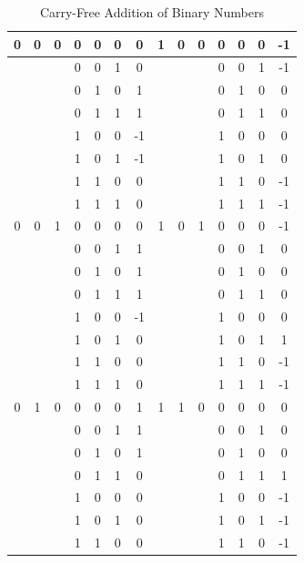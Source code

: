 \documentclass[conference]{IEEEtran}
\begin{document}
\vspace{-.5em}
\begin{table}[h!]
  \centering
  \caption{Carry-Free Addition of Binary Numbers}
  \label{tab:table5}
  \begin{tabular}{|c|c|c|c|c|c||c|||c|c|c|c|c|c||c|}
    \hline
    0 & 0 & 0 & 0 & 0 & 0 & 0  &  1 & 0 & 0 & 0 & 0 & 0 & -1 \\
    \hline
    & & & 0 & 0 & 1 & 0  &  & & & 0 & 0 & 1 & -1 \\
    \hline
    & & & 0 & 1 & 0 & 1  &  & & & 0 & 1 & 0 & 0 \\
    \hline
    & & & 0 & 1 & 1 & 1  &  & & & 0 & 1 & 1 & 0 \\
    \hline
    & & & 1 & 0 & 0 & -1  &  & & & 1 & 0 & 0 & 0 \\
    \hline
    & & & 1 & 0 & 1 & -1  &  & & & 1 & 0 & 1 & 0 \\
    \hline
    & & & 1 & 1 & 0 & 0  &  & & & 1 & 1 & 0 & -1 \\
    \hline
    & & & 1 & 1 & 1 & 0  &  & & & 1 & 1 & 1 & -1 \\
    \hline
    0 & 0 & 1 & 0 & 0 & 0 & 0  &  1 & 0 & 1 & 0 & 0 & 0 & -1 \\
    \hline
    & & & 0 & 0 & 1 & 1  &  & & & 0 & 0 & 1 & 0 \\
    \hline
    & & & 0 & 1 & 0 & 1  &  & & & 0 & 1 & 0 & 0 \\
    \hline
    & & & 0 & 1 & 1 & 1  &  & & & 0 & 1 & 1 & 0 \\
    \hline
    & & & 1 & 0 & 0 & -1  &  & & & 1 & 0 & 0 & 0 \\
    \hline
    & & & 1 & 0 & 1 & 0  &  & & & 1 & 0 & 1 & 1 \\
    \hline
    & & & 1 & 1 & 0 & 0  &  & & & 1 & 1 & 0 & -1 \\
    \hline
    & & & 1 & 1 & 1 & 0  &  & & & 1 & 1 & 1 & -1 \\
    \hline
    0 & 1 & 0 & 0 & 0 & 0 & 1  &  1 & 1 & 0 & 0 & 0 & 0 & 0 \\
    \hline
    & & & 0 & 0 & 1 & 1  &  & & & 0 & 0 & 1 & 0 \\
    \hline
    & & & 0 & 1 & 0 & 1  &  & & & 0 & 1 & 0 & 0 \\
    \hline
    & & & 0 & 1 & 1 & 0  &  & & & 0 & 1 & 1 & 1 \\
    \hline
    & & & 1 & 0 & 0 & 0  &  & & & 1 & 0 & 0 & -1 \\
    \hline
    & & & 1 & 0 & 1 & 0  &  & & & 1 & 0 & 1 & -1 \\
    \hline
    & & & 1 & 1 & 0 & 0  &  & & & 1 & 1 & 0 & -1 \\

\end{tabular}
\end{table}
\end{document}

